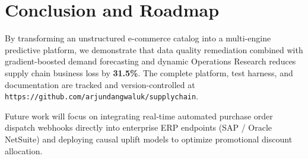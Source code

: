 \documentclass[11pt,a4paper]{article}
\begin{document}
\section{Conclusion and Roadmap}
By transforming an unstructured e-commerce catalog into a multi-engine predictive platform, we demonstrate that data quality remediation combined with gradient-boosted demand forecasting and dynamic Operations Research reduces supply chain business loss by \textbf{31.5\%}. The complete platform, test harness, and documentation are tracked and version-controlled at \texttt{https://github.com/arjundangwaluk/supplychain}.

Future work will focus on integrating real-time automated purchase order dispatch webhooks directly into enterprise ERP endpoints (SAP / Oracle NetSuite) and deploying causal uplift models to optimize promotional discount allocation.
\end{document}
